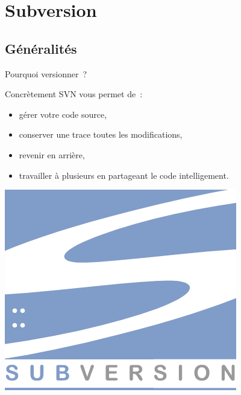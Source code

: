
\section{Subversion}

\subsection{Généralités}
\begin{frame}{Pourquoi versionner~?}
  \begin{alertblock}{Concrètement}
    SVN vous permet de~:
    \begin{itemize}
      \item gérer votre code source,
      \item conserver une trace toutes les modifications,

      \item revenir en arrière,
      \item travailler à plusieurs en partageant le code intelligement.
    \end{itemize}
  \end{alertblock}
  \begin{center}
    \includegraphics[scale=3]{images/logo_svn}
  \end{center}
\end{frame}

